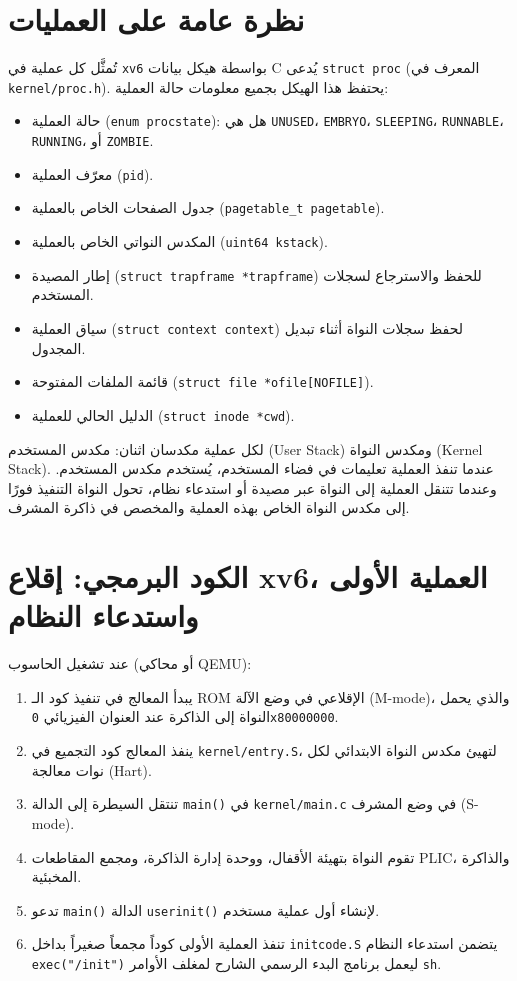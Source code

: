 \section{نظرة عامة على العمليات}
\label{sec:process_overview}

تُمثَّل كل عملية في \texttt{xv6} بواسطة هيكل بيانات C يُدعى \texttt{struct proc} (المعرف في \texttt{kernel/proc.h}).
يحتفظ هذا الهيكل بجميع معلومات حالة العملية:
\begin{itemize}
  \item حالة العملية (\texttt{enum procstate}): هل هي \texttt{UNUSED}، \texttt{EMBRYO}، \texttt{SLEEPING}، \texttt{RUNNABLE}، \texttt{RUNNING}، أو \texttt{ZOMBIE}.
  \item معرّف العملية (\texttt{pid}).
  \item جدول الصفحات الخاص بالعملية (\texttt{pagetable\_t pagetable}).
  \item المكدس النواتي الخاص بالعملية (\texttt{uint64 kstack}).
  \item إطار المصيدة (\texttt{struct trapframe *trapframe}) للحفظ والاسترجاع لسجلات المستخدم.
  \item سياق العملية (\texttt{struct context context}) لحفظ سجلات النواة أثناء تبديل المجدول.
  \item قائمة الملفات المفتوحة (\texttt{struct file *ofile[NOFILE]}).
  \item الدليل الحالي للعملية (\texttt{struct inode *cwd}).
\end{itemize}

لكل عملية مكدسان اثنان: مكدس المستخدم (User Stack) ومكدس النواة (Kernel Stack).
عندما تنفذ العملية تعليمات في فضاء المستخدم، يُستخدم مكدس المستخدم.
وعندما تتنقل العملية إلى النواة عبر مصيدة أو استدعاء نظام، تحول النواة التنفيذ فورًا إلى مكدس النواة الخاص بهذه العملية والمخصص في ذاكرة المشرف.

\section{الكود البرمجي: إقلاع xv6، العملية الأولى واستدعاء النظام}
\label{sec:code_boot_first_proc}

عند تشغيل الحاسوب (أو محاكي QEMU):
\begin{enumerate}
  \item يبدأ المعالج في تنفيذ كود الـ ROM الإقلاعي في وضع الآلة (M-mode)، والذي يحمل النواة إلى الذاكرة عند العنوان الفيزيائي \texttt{0x80000000}.
  \item ينفذ المعالج كود التجميع في \texttt{kernel/entry.S}، لتهيئ مكدس النواة الابتدائي لكل نوات معالجة (Hart).
  \item تنتقل السيطرة إلى الدالة \texttt{main()} في \texttt{kernel/main.c} في وضع المشرف (S-mode).
  \item تقوم النواة بتهيئة الأقفال، ووحدة إدارة الذاكرة، ومجمع المقاطعات PLIC، والذاكرة المخبئية.
  \item تدعو \texttt{main()} الدالة \texttt{userinit()} لإنشاء أول عملية مستخدم.
  \item تنفذ العملية الأولى كوداً مجمعاً صغيراً بداخل \texttt{initcode.S} يتضمن استدعاء النظام \texttt{exec("/init")} ليعمل برنامج البدء الرسمي الشارح لمغلف الأوامر \texttt{sh}.
\end{enumerate}

